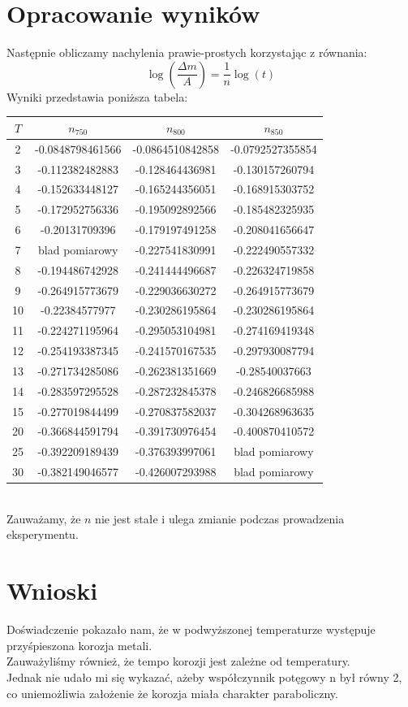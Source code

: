 \documentclass[a4paper,12pt]{article}
\begin{document}
\section{Opracowanie wyników}
Następnie obliczamy nachylenia prawie-prostych korzystając z równania:\\
$$\log(\dfrac{\Delta m}{A})=\dfrac{1}{n}\log(t)$$
Wyniki przedstawia poniższa tabela:\\
\begin{tabular}{|c|c|c|c|}
\hline
$T$&$n_{750}$&$n_{800}$&$n_{850}$\\
\hline
2&-0.0848798461566&-0.0864510842858&-0.0792527355854\\
3&-0.112382482883&-0.128464436981&-0.130157260794\\
4&-0.152633448127&-0.165244356051&-0.168915303752\\
5&-0.172952756336&-0.195092892566&-0.185482325935\\
6&-0.20131709396&-0.179197491258&-0.208041656647\\
7&blad pomiarowy&-0.227541830991&-0.222490557332\\
8&-0.194486742928&-0.241444496687&-0.226324719858\\
9&-0.264915773679&-0.229036630272&-0.264915773679\\
10&-0.22384577977&-0.230286195864&-0.230286195864\\
11&-0.224271195964&-0.295053104981&-0.274169419348\\
12&-0.254193387345&-0.241570167535&-0.297930087794\\
13&-0.271734285086&-0.262381351669&-0.28540037663\\
14&-0.283597295528&-0.287232845378&-0.246826685988\\
15&-0.277019844499&-0.270837582037&-0.304268963635\\
20&-0.366844591794&-0.391730976454&-0.400870410572\\
25&-0.392209189439&-0.376393997061&blad pomiarowy\\
30&-0.382149046577&-0.426007293988&blad pomiarowy\\
\hline
\end{tabular}\\
Zauważamy, że $n$ nie jest stałe i ulega zmianie podczas prowadzenia eksperymentu.
\section{Wnioski}
Doświadczenie pokazało nam, że w podwyższonej temperaturze występuje przyśpieszona korozja metali.\\
Zauważyliśmy również, że tempo korozji jest zależne od temperatury.\\
Jednak nie udało mi się wykazać, ażeby współczynnik potęgowy n był równy 2, co uniemożliwia założenie że korozja miała charakter paraboliczny.
\end{document}
